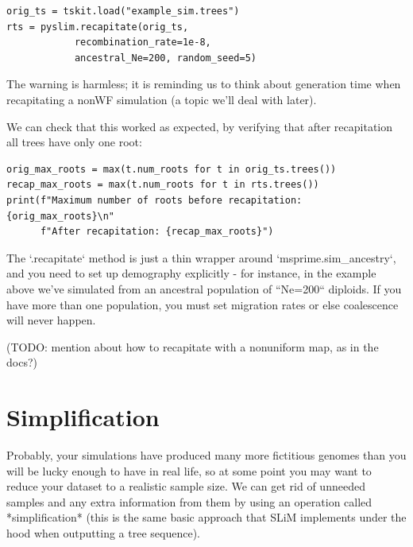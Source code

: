 \documentclass[12pt]{article}
\begin{document}
\begin{verbatim}
orig_ts = tskit.load("example_sim.trees")
rts = pyslim.recapitate(orig_ts,
            recombination_rate=1e-8,
            ancestral_Ne=200, random_seed=5)
\end{verbatim}
The warning is harmless; it is reminding us to think about generation time
when recapitating a nonWF simulation (a topic we'll deal with later).

We can check that this worked as expected, by verifying that after recapitation
all trees have only one root:
\begin{verbatim}
orig_max_roots = max(t.num_roots for t in orig_ts.trees())
recap_max_roots = max(t.num_roots for t in rts.trees())
print(f"Maximum number of roots before recapitation: {orig_max_roots}\n"
      f"After recapitation: {recap_max_roots}")
\end{verbatim}

The `.recapitate` method
is just a thin wrapper around `msprime.sim\_ancestry`,
and you need to set up demography explicitly - for instance, in the example above
we've simulated from an ancestral population of ``Ne=200`` diploids.
If you have more than one population,
you must set migration rates or else coalescence will never happen.

(TODO: mention about how to recapitate with a nonuniform map, as in the docs?)


\section{Simplification}


Probably, your simulations have produced many more fictitious genomes
than you will be lucky enough to have in real life,
so at some point you may want to reduce your dataset to a realistic sample size.
We can get rid of unneeded samples and any extra information from them by using
an operation called *simplification* (this is the same basic approach that SLiM
implements under the hood when outputting a tree sequence).
\end{document}
